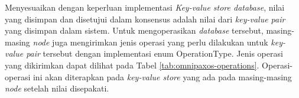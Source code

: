 Menyesuaikan dengan keperluan implementasi \textit{Key-value store database}, nilai yang disimpan dan disetujui dalam konsensus adalah nilai dari \textit{key-value pair} yang disimpan dalam sistem. Untuk mengoperasikan \textit{database} tersebut, masing-masing \textit{node} juga mengirimkan jenis operasi yang perlu dilakukan untuk \textit{key-value pair} tersebut dengan implementasi enum OperationType. Jenis operasi yang dikirimkan dapat dilihat pada Tabel \ref{tab:omnipaxos-operations}. Operasi-operasi ini akan diterapkan pada \textit{key-value store} yang ada pada masing-masing \textit{node} setelah nilai disepakati.

\begin{table}[h]
    \centering
    \caption{Jenis Operasi untuk Pesan Database}
    \label{tab:omnipaxos-operations}
\end{table}


